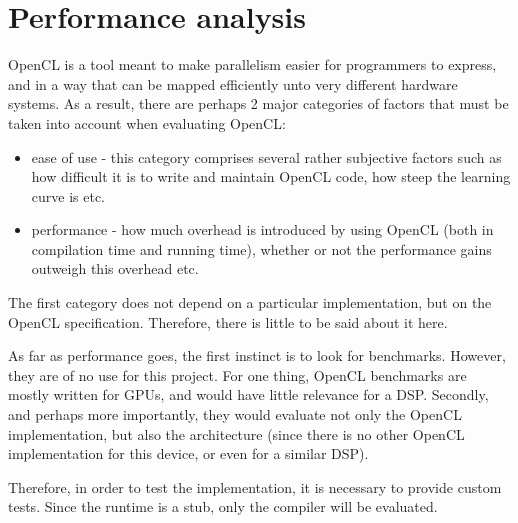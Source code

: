 \chapter{Performance analysis}
\label{chapter:results}

\newcommand{\vectype}{\mbox{\_\_vectype\_\_}}
\newcommand{\vpack}{\mbox{\_\_builtin\_vpack}}
\newcommand{\vunpack}{\mbox{\_\_builtin\_vunpack}}

OpenCL is a tool meant to make parallelism easier for programmers to express, and in a way that can be mapped efficiently unto very different hardware systems. As a result, there are perhaps 2 major categories of factors that must be taken into account when evaluating OpenCL: 
\begin{itemize}
\item ease of use - this category comprises several rather subjective factors such as how difficult it is to write and maintain OpenCL code, how steep the learning curve is etc.
\item performance - how much overhead is introduced by using OpenCL (both in compilation time and running time), whether or not the performance gains outweigh this overhead etc.
\end{itemize}

The first category does not depend on a particular implementation, but on the OpenCL specification. Therefore, there is little to be said about it here.

As far as performance goes, the first instinct is to look for benchmarks. However, they are of no use for this project. For one thing, OpenCL benchmarks are mostly written for GPUs, and would have little relevance for a DSP. Secondly, and perhaps more importantly, they would evaluate not only the OpenCL implementation, but also the architecture (since there is no other OpenCL implementation for this device, or even for a similar DSP).

Therefore, in order to test the implementation, it is necessary to provide custom tests. Since the runtime is a stub, only the compiler will be evaluated. %


